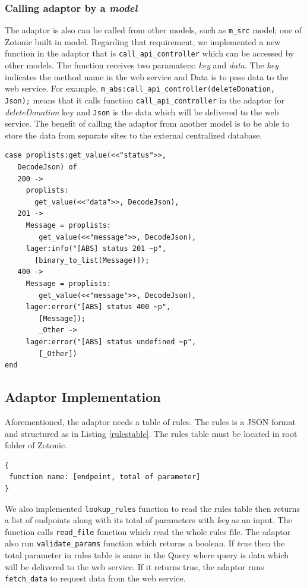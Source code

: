 \documentclass[conference]{IEEEtran}
\begin{document}
\subsubsection{Calling adaptor by a \textit{model}}
The adaptor is also can be called from other models, such as \texttt{m\_src} model; one of Zotonic built in model. Regarding that requirement, we implemented a new function in the adaptor that is \texttt{call\_api\_controller} which can be accessed by other models. The function receives two paramaters: \textit{key} and \textit{data}. The \textit{key} indicates the method name in the web service and Data is to pass data to the web service. For example, \texttt{m\_abs:call\_api\_controller(deleteDonation, Json);} means that it calls function \texttt{call\_api\_controller} in the adaptor for \textit{deleteDonation} key and \texttt{Json} is the data which will be delivered to the web service. The benefit of calling the adaptor from another model is to be able to store the data from separate sites to the external centralized database.


\begin{lstlisting}[caption=Implementation of call\_api\_controller, label = callapicont]
 case proplists:get_value(<<"status">>, 
   DecodeJson) of 
   200 ->
     proplists:
       get_value(<<"data">>, DecodeJson),
   201 ->
     Message = proplists:
        get_value(<<"message">>, DecodeJson),
     lager:info("[ABS] status 201 ~p", 
       [binary_to_list(Message)]);
   400 ->
     Message = proplists:
        get_value(<<"message">>, DecodeJson),
     lager:error("[ABS] status 400 ~p", 
        [Message]);
        _Other ->
     lager:error("[ABS] status undefined ~p", 
        [_Other])
end
\end{lstlisting}

\subsection{Adaptor Implementation}
Aforementioned, the adaptor needs a table of rules. The rules is a JSON format and structured as in Listing \ref{rulestable}. The rules table must be located in root folder of Zotonic. 

\begin{lstlisting}[caption=Structure of Rules, label=rulestable]
{
 function name: [endpoint, total of parameter]
}
\end{lstlisting}

We also implemented \texttt{lookup\_rules} function to read the rules table then returns a list of endpoints along with its total of parameters with \textit{key} as an input. The function calls \texttt{read\_file} function which read the whole rules file. The adaptor also run \texttt{validate\_params} function which returns a boolean. If \textit{true} then the total parameter in rules table is same in the Query where query is data which will be delivered to the web service. If it returns true, the adaptor runs \texttt{fetch\_data} to request data from the web service. 
\end{document}
